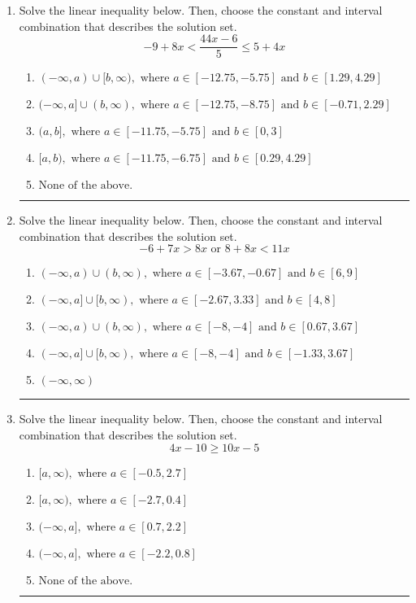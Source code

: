 \documentclass[14pt]{extbook}
\newcommand{\litem}[1]{\item#1\hspace*{-1cm}\rule{\textwidth}{0.4pt}}
\begin{document}
\begin{enumerate}
{\begin{enumerate}[label=\Alph*.]
\end{enumerate} }
\litem{
Solve the linear inequality below. Then, choose the constant and interval combination that describes the solution set.\[ -9 + 8 x < \frac{44 x - 6}{5} \leq 5 + 4 x \]\begin{enumerate}[label=\Alph*.]
\item \( (-\infty, a) \cup [b, \infty), \text{ where } a \in [-12.75, -5.75] \text{ and } b \in [1.29, 4.29] \)
\item \( (-\infty, a] \cup (b, \infty), \text{ where } a \in [-12.75, -8.75] \text{ and } b \in [-0.71, 2.29] \)
\item \( (a, b], \text{ where } a \in [-11.75, -5.75] \text{ and } b \in [0, 3] \)
\item \( [a, b), \text{ where } a \in [-11.75, -6.75] \text{ and } b \in [0.29, 4.29] \)
\item \( \text{None of the above.} \)

\end{enumerate} }
\litem{
Solve the linear inequality below. Then, choose the constant and interval combination that describes the solution set.\[ -6 + 7 x > 8 x \text{ or } 8 + 8 x < 11 x \]\begin{enumerate}[label=\Alph*.]
\item \( (-\infty, a) \cup (b, \infty), \text{ where } a \in [-3.67, -0.67] \text{ and } b \in [6, 9] \)
\item \( (-\infty, a] \cup [b, \infty), \text{ where } a \in [-2.67, 3.33] \text{ and } b \in [4, 8] \)
\item \( (-\infty, a) \cup (b, \infty), \text{ where } a \in [-8, -4] \text{ and } b \in [0.67, 3.67] \)
\item \( (-\infty, a] \cup [b, \infty), \text{ where } a \in [-8, -4] \text{ and } b \in [-1.33, 3.67] \)
\item \( (-\infty, \infty) \)

\end{enumerate} }
\litem{
Solve the linear inequality below. Then, choose the constant and interval combination that describes the solution set.\[ 4x -10 \geq 10x -5 \]\begin{enumerate}[label=\Alph*.]
\item \( [a, \infty), \text{ where } a \in [-0.5, 2.7] \)
\item \( [a, \infty), \text{ where } a \in [-2.7, 0.4] \)
\item \( (-\infty, a], \text{ where } a \in [0.7, 2.2] \)
\item \( (-\infty, a], \text{ where } a \in [-2.2, 0.8] \)
\item \( \text{None of the above}. \)

\end{enumerate} }
\end{enumerate}
\end{document}
